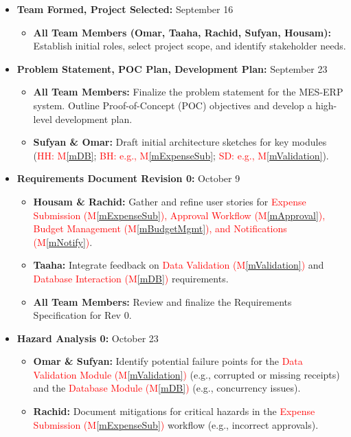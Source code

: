 \documentclass[12pt, titlepage]{article}
\newcommand{\mref}[1]{M\ref{#1}}
\begin{document}
\begin{itemize}
  \item \textbf{Team Formed, Project Selected:} September 16
  \begin{itemize}
    \item \textbf{All Team Members (Omar, Taaha, Rachid, Sufyan, Housam):}
    Establish initial roles, select project scope, and identify stakeholder needs.
  \end{itemize}

  \item \textbf{Problem Statement, POC Plan, Development Plan:} September 23
  \begin{itemize}
    \item \textbf{All Team Members:}
    Finalize the problem statement for the MES-ERP system. Outline Proof-of-Concept (POC) objectives and develop a high-level development plan.
    \item \textbf{Sufyan \& Omar:} Draft initial architecture sketches for key modules (\textcolor{red}{HH: \mref{mDB}}; \textcolor{red}{BH: e.g., \mref{mExpenseSub}}; \textcolor{red}{SD: e.g., \mref{mValidation}}).
  \end{itemize}

  \item \textbf{Requirements Document Revision 0:} October 9
  \begin{itemize}
    \item \textbf{Housam \& Rachid:} Gather and refine user stories for \textcolor{red}{Expense Submission (\mref{mExpenseSub}), Approval Workflow (\mref{mApproval}), Budget Management (\mref{mBudgetMgmt}), and Notifications (\mref{mNotify})}.
    \item \textbf{Taaha:} Integrate feedback on \textcolor{red}{Data Validation (\mref{mValidation})} and \textcolor{red}{Database Interaction (\mref{mDB})} requirements.
    \item \textbf{All Team Members:} Review and finalize the Requirements Specification for Rev 0.
  \end{itemize}

  \item \textbf{Hazard Analysis 0:} October 23
  \begin{itemize}
    \item \textbf{Omar \& Sufyan:} Identify potential failure points for the \textcolor{red}{Data Validation Module (\mref{mValidation})} (e.g., corrupted or missing receipts) and the \textcolor{red}{Database Module (\mref{mDB})} (e.g., concurrency issues).
    \item \textbf{Rachid:} Document mitigations for critical hazards in the \textcolor{red}{Expense Submission (\mref{mExpenseSub})} workflow (e.g., incorrect approvals).
  \end{itemize}


\end{itemize}
\end{document}
